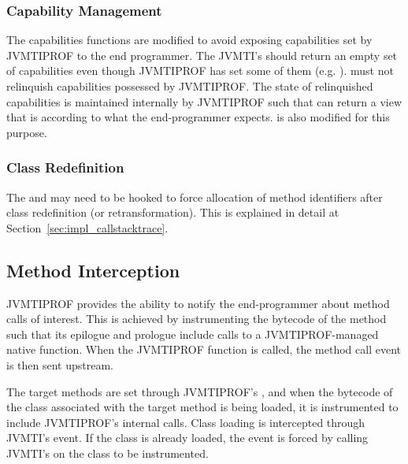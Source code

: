 \subsubsection*{Capability Management}

The capabilities functions are modified to avoid exposing capabilities set by JVMTIPROF to the end programmer. The JVMTI's  should return an empty set of capabilities even though JVMTIPROF has set some of them (e.g. ).  must not relinquish capabilities possessed by JVMTIPROF. The state of relinquished capabilities is maintained internally by JVMTIPROF such that  can return a view that is according to what the end-programmer expects.  is also modified for this purpose.


\subsubsection*{Class Redefinition}

The  and  may need to be hooked to force allocation of method identifiers after class redefinition (or retransformation). This is explained in detail at Section~\ref{sec:impl_callstacktrace}.

\subsection{Method Interception}

JVMTIPROF provides the ability to notify the end-programmer about method calls of interest. This is achieved by instrumenting the bytecode of the method such that its epilogue and prologue include calls to a JVMTIPROF-managed native function. When the JVMTIPROF function is called, the method call event is then sent upstream.

The target methods are set through JVMTIPROF's , and when the bytecode of the class associated with the target method is being loaded, it is instrumented to include JVMTIPROF's internal calls. Class loading is intercepted through JVMTI's   event. If the class is already loaded, the event is forced by calling JVMTI's  on the class to be instrumented.

